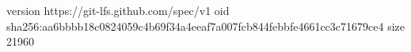 version https://git-lfs.github.com/spec/v1
oid sha256:aa6bbbb18c0824059c4b69f34a4eeaf7a007fcb844febbfe4661cc3c71679ce4
size 21960
